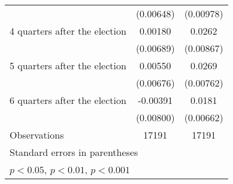 \begin{table}[htbp]
\begin{tabular}{l*{2}{c}}
                    &   (0.00648)         &   (0.00978)         \\
[1em]
 4 quarters after the election&     0.00180         &      0.0262\sym{**} \\
                    &   (0.00689)         &   (0.00867)         \\
[1em]
 5 quarters after the election&     0.00550         &      0.0269\sym{***}\\
                    &   (0.00676)         &   (0.00762)         \\
[1em]
 6 quarters after the election&    -0.00391         &      0.0181\sym{**} \\
                    &   (0.00800)         &   (0.00662)         \\
\hline
Observations        &       17191         &       17191         \\
\hline\hline
\multicolumn{3}{l}{\footnotesize Standard errors in parentheses}\\
\multicolumn{3}{l}{\footnotesize \sym{*} \(p<0.05\), \sym{**} \(p<0.01\), \sym{***} \(p<0.001\)}\\
\end{tabular}
\end{table}
